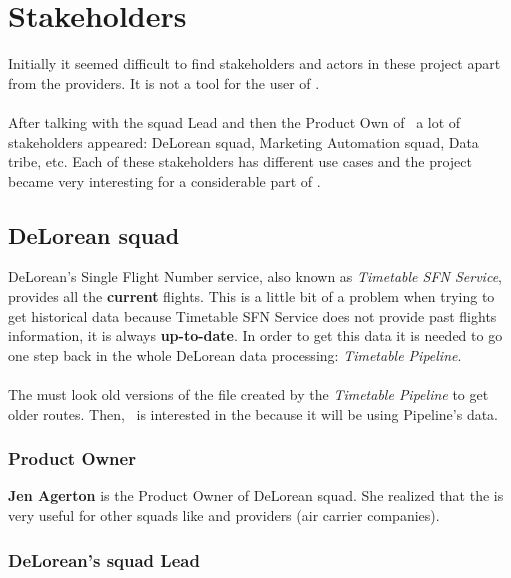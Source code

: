 
\chapter{Stakeholders}

\label{chapter04}

Initially it seemed difficult to find stakeholders and actors in these project apart from the providers. It is not a tool for the user of \company.
\\\\
After talking with the squad Lead and then the Product Own of \squad\ a lot of stakeholders appeared: DeLorean squad, Marketing Automation squad, Data tribe, etc. Each of these stakeholders has different use cases and the project became very interesting for a considerable part of \company.

\section{DeLorean squad} \label{dlr}

DeLorean's Single Flight Number service, also known as \textit{Timetable SFN Service}, provides all the \textbf{current} flights. This is a little bit of a problem when trying to get historical data because Timetable SFN Service does not provide past flights information, it is always \textbf{up-to-date}. In order to get this data it is needed to go one step back in the whole DeLorean data processing: \textit{Timetable Pipeline}.
\\\\
The \thesistitle must look old versions of the file created by the \textit{Timetable Pipeline} to get older routes. Then, \squad\ is interested in the \thesistitle because it will be using Pipeline's data.

\subsection{Product Owner} \label{product_owner}

\textbf{Jen Agerton} is the Product Owner of DeLorean squad. She realized that the \thesistitle is very useful for other squads like  and providers (air carrier companies).

\subsection{DeLorean's squad Lead}

